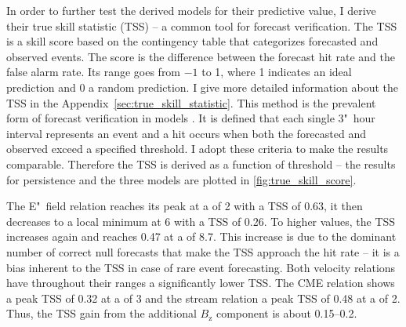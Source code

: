 In order to further test the derived models for their predictive value, I derive their true skill statistic (TSS) -- a common tool for forecast verification. The TSS is a skill score based on the contingency table that categorizes forecasted and observed events. The score is the difference between the forecast hit rate and the false alarm rate. Its range goes from $-1$ to 1, where 1 indicates an ideal prediction and 0 a random prediction. I give more detailed information about the TSS in the Appendix~\ref{sec:true_skill_statistic}. This method is the prevalent form of forecast verification in \Kp{} models \citep{Detman1999,Wing2005,Savani2017}. It is defined that each single 3"~hour \Kp{} interval represents an event and a hit occurs when both the forecasted and observed \Kp{} exceed a specified threshold. I adopt these criteria to make the results comparable. Therefore the TSS is derived as a function of \Kp{} threshold -- the results for persistence and the three models are plotted in \autoref{fig:true_skill_score}.
\begin{figure}
\end{figure}

The E"~field relation reaches its peak at a \Kp{} of 2 with a TSS of 0.63, it then decreases to a local minimum at \Kp{} 6 with a TSS of 0.26. To higher \Kp{} values, the TSS increases again and reaches 0.47 at a \Kp{} of 8.7. This increase is due to the dominant number of correct null forecasts that make the TSS approach the hit rate \citep{Doswell1990} -- it is a bias inherent to the TSS in case of rare event forecasting. Both velocity relations have throughout their \Kp{} ranges a significantly lower TSS. The CME relation shows a peak TSS of 0.32 at a \Kp{} of 3 and the stream relation a peak TSS of 0.48 at a \Kp{} of 2. Thus, the TSS gain from the additional $B_\text{z}$ component is about \numrange{0.15}{0.2}.\\

